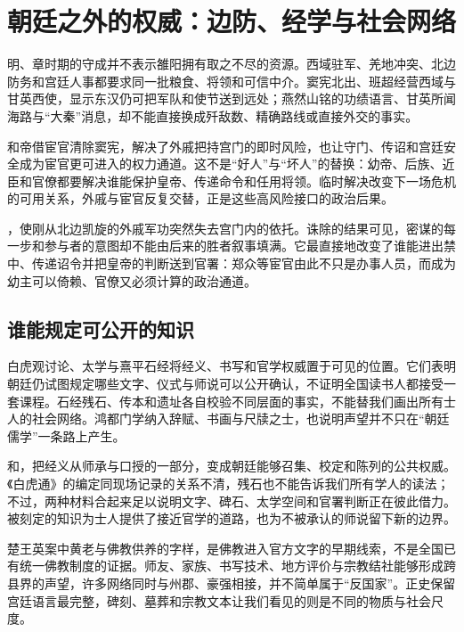\section{朝廷之外的权威：边防、经学与社会网络}
\label{sec:eastern-han-court-society}

明、章时期的守成并不表示雒阳拥有取之不尽的资源。西域驻军、羌地冲突、北边防务和宫廷人事都要求同一批粮食、将领和可信中介。窦宪北出、班超经营西域与甘英西使，显示东汉仍可把军队和使节送到远处；燕然山铭的功绩语言、甘英所闻海路与“大秦”消息，却不能直接换成歼敌数、精确路线或直接外交的事实。

和帝借宦官清除窦宪，解决了外戚把持宫门的即时风险，也让守门、传诏和宫廷安全成为宦官更可进入的权力通道。这不是“好人”与“坏人”的替换：幼帝、后族、近臣和官僚都要解决谁能保护皇帝、传递命令和任用将领。临时解决改变下一场危机的可用关系，外戚与宦官反复交替，正是这些高风险接口的政治后果。

，使刚从北边凯旋的外戚军功突然失去宫门内的依托。诛除的结果可见，密谋的每一步和参与者的意图却不能由后来的胜者叙事填满。它最直接地改变了谁能进出禁中、传递诏令并把皇帝的判断送到官署：郑众等宦官由此不只是办事人员，而成为幼主可以倚赖、官僚又必须计算的政治通道。

\subsection{谁能规定可公开的知识}

白虎观讨论、太学与熹平石经将经义、书写和官学权威置于可见的位置。它们表明朝廷仍试图规定哪些文字、仪式与师说可以公开确认，不证明全国读书人都接受一套课程。石经残石、传本和遗址各自校验不同层面的事实，不能替我们画出所有士人的社会网络。鸿都门学纳入辞赋、书画与尺牍之士，也说明声望并不只在“朝廷儒学”一条路上产生。

和，把经义从师承与口授的一部分，变成朝廷能够召集、校定和陈列的公共权威。《白虎通》的编定同现场记录的关系不清，残石也不能告诉我们所有学人的读法；不过，两种材料合起来足以说明文字、碑石、太学空间和官署判断正在彼此借力。被刻定的知识为士人提供了接近官学的道路，也为不被承认的师说留下新的边界。

楚王英案中黄老与佛教供养的字样，是佛教进入官方文字的早期线索，不是全国已有统一佛教制度的证据。师友、家族、书写技术、地方评价与宗教结社能够形成跨县界的声望，许多网络同时与州郡、豪强相接，并不简单属于“反国家”。正史保留宫廷语言最完整，碑刻、墓葬和宗教文本让我们看见的则是不同的物质与社会尺度。

